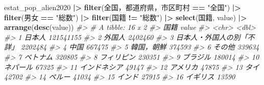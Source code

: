 \documentclass[
  xelatex, ja=standard]{bxjsbook}
\newenvironment{Shaded}{\begin{snugshade}}{\end{snugshade}}
\newcommand{\AttributeTok}[1]{\textcolor[rgb]{0.13,0.29,0.53}{#1}}
\newcommand{\CommentTok}[1]{\textcolor[rgb]{0.56,0.35,0.01}{\textit{#1}}}
\newcommand{\FunctionTok}[1]{\textcolor[rgb]{0.13,0.29,0.53}{\textbf{#1}}}
\newcommand{\NormalTok}[1]{#1}
\newcommand{\SpecialCharTok}[1]{\textcolor[rgb]{0.81,0.36,0.00}{\textbf{#1}}}
\newcommand{\StringTok}[1]{\textcolor[rgb]{0.31,0.60,0.02}{#1}}
\theoremstyle{definition}
\theoremstyle{definition}
\theoremstyle{definition}
\theoremstyle{definition}
\theoremstyle{remark}
\begin{document}
\begin{Shaded}
\begin{Highlighting}[]
\NormalTok{estat\_pop\_alien2020 }\SpecialCharTok{|\textgreater{}} 
  \FunctionTok{filter}\NormalTok{(}\StringTok{\textasciigrave{}}\AttributeTok{全国，都道府県，市区町村}\StringTok{\textasciigrave{}} \SpecialCharTok{==} \StringTok{"全国"}\NormalTok{) }\SpecialCharTok{|\textgreater{}}
  \FunctionTok{filter}\NormalTok{(男女 }\SpecialCharTok{==} \StringTok{"総数"}\NormalTok{) }\SpecialCharTok{|\textgreater{}}
  \FunctionTok{filter}\NormalTok{(国籍 }\SpecialCharTok{!=} \StringTok{"総数"}\NormalTok{) }\SpecialCharTok{|\textgreater{}}
  \FunctionTok{select}\NormalTok{(国籍, value) }\SpecialCharTok{|\textgreater{}}
  \FunctionTok{arrange}\NormalTok{(}\FunctionTok{desc}\NormalTok{(value))}
\CommentTok{\#\textgreater{} \# A tibble: 16 x 2}
\CommentTok{\#\textgreater{}    国籍                           value}
\CommentTok{\#\textgreater{}    \textless{}chr\textgreater{}                          \textless{}dbl\textgreater{}}
\CommentTok{\#\textgreater{}  1 日本人                     121541155}
\CommentTok{\#\textgreater{}  2 外国人                       2402460}
\CommentTok{\#\textgreater{}  3 日本人・外国人の別「不詳」   2202484}
\CommentTok{\#\textgreater{}  4 中国                          667475}
\CommentTok{\#\textgreater{}  5 韓国，朝鮮                    374593}
\CommentTok{\#\textgreater{}  6 その他                        339634}
\CommentTok{\#\textgreater{}  7 ベトナム                      320805}
\CommentTok{\#\textgreater{}  8 フィリピン                    230351}
\CommentTok{\#\textgreater{}  9 ブラジル                      180014}
\CommentTok{\#\textgreater{} 10 ネパール                       67325}
\CommentTok{\#\textgreater{} 11 インドネシア                   49147}
\CommentTok{\#\textgreater{} 12 アメリカ                       47875}
\CommentTok{\#\textgreater{} 13 タイ                           42702}
\CommentTok{\#\textgreater{} 14 ペルー                         41034}
\CommentTok{\#\textgreater{} 15 インド                         27915}
\CommentTok{\#\textgreater{} 16 イギリス                       13590}
\end{Highlighting}
\end{Shaded}
\end{document}
